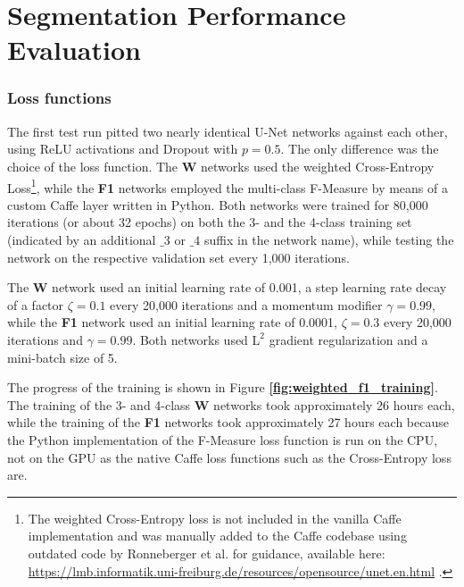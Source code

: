 	\section{Segmentation Performance Evaluation}

	\subsubsection{Loss functions}

\noindent The first test run pitted two nearly identical U-Net networks against each other, using ReLU activations and Dropout with $p = 0.5$. The only difference was the choice of the loss function. The \textbf{W} networks used the weighted Cross-Entropy Loss\footnote{The weighted Cross-Entropy loss is not included in the vanilla Caffe implementation and was manually added to the Caffe codebase using outdated code by Ronneberger et al.  for guidance, available here: \url{https://lmb.informatik.uni-freiburg.de/resources/opensource/unet.en.html} .}, while the \textbf{F1} networks employed the multi-class F-Measure by means of a custom Caffe layer written in Python. Both networks were trained for 80,000 iterations (or about 32 epochs) on both the 3- and the 4-class training set (indicated by an additional $\_3$ or $\_4$ suffix in the network name), while testing the network on the respective validation set every 1,000 iterations.

The \textbf{W} network used an initial learning rate of 0.001, a step learning rate decay of a factor $\zeta = 0.1$ every 20,000 iterations and a momentum modifier $\gamma = 0.99$, while the \textbf{F1} network used an initial learning rate of 0.0001, $\zeta = 0.3$ every 20,000 iterations and $\gamma = 0.99$. Both networks used $\text{L}^2$ gradient regularization and a mini-batch size of 5.

The progress of the training is shown in Figure \textbf{\ref{fig:weighted_f1_training}}. The training of the 3- and 4-class \textbf{W} networks took approximately 26 hours each, while the training of the \textbf{F1} networks took approximately 27 hours each because the Python implementation of the F-Measure loss function is run on the CPU, not on the GPU as the native Caffe loss functions such as the Cross-Entropy loss are.\\

